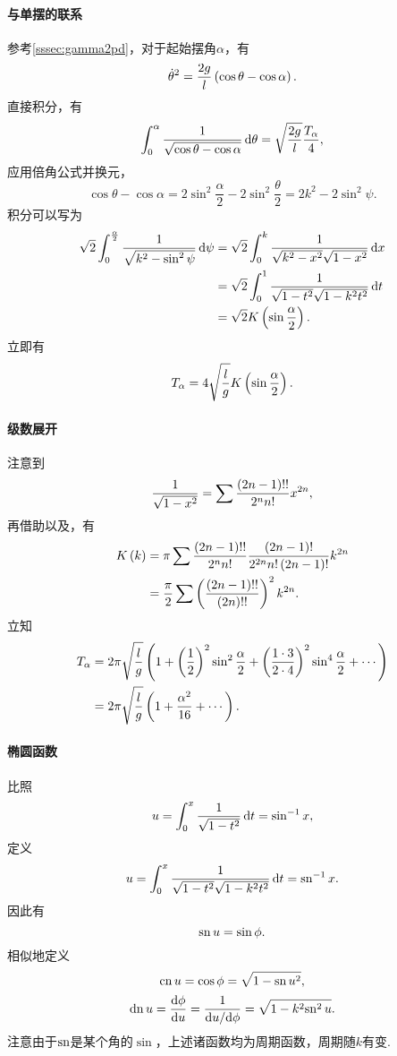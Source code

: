 \documentclass[UTF-8]{ctexart}
\begin{document}
  \paragraph{与单摆的联系}参考\ref{sssec:gamma2pd}，对于起始摆角$\alpha$，有
  \[ \dot{\theta}^2=\frac{2g}{l}\left(\cos\theta-\cos\alpha\right). \]
  直接积分，有
  \[ \int_0^{\alpha} \frac{1}{\sqrt{\cos\theta-\cos\alpha}} \,\mathrm{d} \theta = \sqrt{\frac{2g}{l}}\frac{T_\alpha}{4}, \]
  应用倍角公式并换元，
  \[ \cos\theta-\cos\alpha = 2\sin^2\frac{\alpha}{2}-2\sin^2\frac{\theta}{2} =  2k^2-2\sin^2\psi. \]
  积分可以写为
  \begin{align*}
    \sqrt{2}\int_0^{\frac{\alpha}{2}} \frac{1}{\sqrt{k^2-\sin^2\psi}} \,\mathrm{d} \psi &= \sqrt{2}\int_0^{k} \frac{1}{\sqrt{k^2-x^2}\sqrt{1-x^2}} \,\mathrm{d} x\\
    &= \sqrt{2}\int_0^{1} \frac{1}{\sqrt{1-t^2}\sqrt{1-k^2t^2}} \,\mathrm{d} t\\
    &= \sqrt{2}K\left(\sin\frac{\alpha}{2}\right).
  \end{align*}
  立即有
  \[ T_\alpha = 4\sqrt{\frac{l}{g}}K\left(\sin\frac{\alpha}{2}\right). \]
  \paragraph{级数展开}注意到
  \[ \frac{1}{\sqrt{1-x^2}} = \sum \frac{\left(2n-1\right)!!}{2^n n!}x^{2n}, \]
  再借助以及，有
  \begin{align*}
  K\left(k\right) &= \pi \sum \frac{\left(2n-1\right)!!}{2^n n!}\frac{\left(2n-1\right)!}{2^{2n}n!\left(2n-1\right)!}k^{2n}\\
  &= \frac{\pi}{2}\sum\left(\frac{\left(2n-1\right)!!}{\left(2n\right)!!}\right)^2k^{2n}.
  \end{align*}
  立知
  \begin{align*}
  T_\alpha &= 2\pi\sqrt{\frac{l}{g}}\left(1+\left(\frac{1}{2}\right)^2\sin^2\frac{\alpha}{2}+\left(\frac{1\cdot 3}{2\cdot 4}\right)^2\sin^4\frac{\alpha}{2}+\cdots\right) \\
  &= 2\pi\sqrt{\frac{l}{g}}\left(1+\frac{\alpha^2}{16}+\cdots\right) .
  \end{align*}
  \paragraph{椭圆函数}比照
  \[ u = \int_0^{x} \frac{1}{\sqrt{1-t^2}} \,\mathrm{d} t = \sin^{-1}x, \]
  定义
  \[ u = \int_0^{x} \frac{1}{\sqrt{1-t^2}\sqrt{1-k^2t^2}} \,\mathrm{d} t = \mathrm{sn}^{-1}\,x. \]
  因此有
  \[ \mathrm{sn}\, u = \sin \phi. \]
  相似地定义
  \[ \mathrm{cn}\, u = \cos \phi = \sqrt{1-\mathrm{sn}\, u^2}, \]
  \[ \mathrm{dn}\, u = \frac{\mathrm{d} \phi}{\mathrm{d} u} = \frac{1}{\mathrm{d} u/\mathrm{d} \phi} = \sqrt{1-k^2\mathrm{sn}^2\,u}. \]
  注意由于$\mathrm{sn}$是某个角的$\sin$，上述诸函数均为周期函数，周期随$k$有变.
\end{document}
